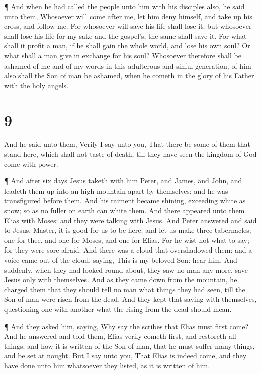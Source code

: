  ¶ And when he had called the people unto him with his
disciples also, he said unto them, Whosoever will come after me, let him
deny himself, and take up his cross, and follow me.  For
whosoever will save his life shall lose it; but whosoever shall lose his
life for my sake and the gospel's, the same shall save it. 
For what shall it profit a man, if he shall gain the whole world, and
lose his own soul?  Or what shall a man give in exchange
for his soul?  Whosoever therefore shall be ashamed of me
and of my words in this adulterous and sinful generation; of him also
shall the Son of man be ashamed, when he cometh in the glory of his
Father with the holy angels.

\hypertarget{section-8}{%
\section{9}\label{section-8}}

 And he said unto them, Verily I say unto you, That there be
some of them that stand here, which shall not taste of death, till they
have seen the kingdom of God come with power.

 ¶ And after six days Jesus taketh with him Peter, and
James, and John, and leadeth them up into an high mountain apart by
themselves: and he was transfigured before them.  And his
raiment became shining, exceeding white as snow; so as no fuller on
earth can white them.  And there appeared unto them Elias
with Moses: and they were talking with Jesus.  And Peter
answered and said to Jesus, Master, it is good for us to be here: and
let us make three tabernacles; one for thee, and one for Moses, and one
for Elias.  For he wist not what to say; for they were sore
afraid.  And there was a cloud that overshadowed them: and a
voice came out of the cloud, saying, This is my beloved Son: hear him.
 And suddenly, when they had looked round about, they saw no
man any more, save Jesus only with themselves.  And as they
came down from the mountain, he charged them that they should tell no
man what things they had seen, till the Son of man were risen from the
dead.  And they kept that saying with themselves,
questioning one with another what the rising from the dead should mean.

 ¶ And they asked him, saying, Why say the scribes that
Elias must first come?  And he answered and told them,
Elias verily cometh first, and restoreth all things; and how it is
written of the Son of man, that he must suffer many things, and be set
at nought.  But I say unto you, That Elias is indeed come,
and they have done unto him whatsoever they listed, as it is written of
him.

